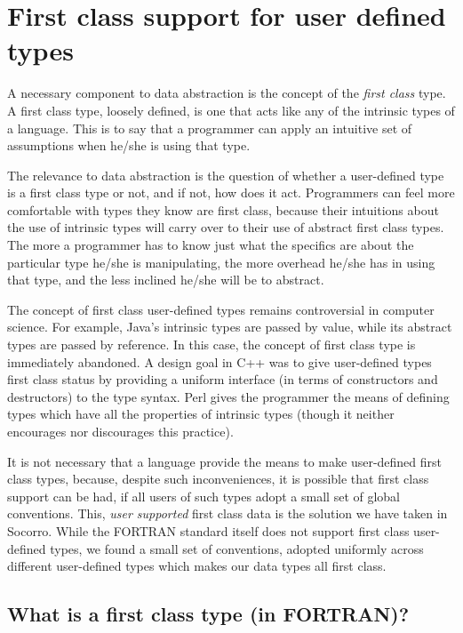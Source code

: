 
\section{First class support for user defined types}

A necessary component to data abstraction is the concept of the {\em
first class} type.  A first class type, loosely defined, is one that
acts like any of the intrinsic types of a language.  This is to say
that a programmer can apply an intuitive set of assumptions when
he/she is using that type.

The relevance to data abstraction is the question of whether a
user-defined type is a first class type or not, and if not, how does
it act.  Programmers can feel more comfortable with types they know
are first class, because their intuitions about the use of intrinsic
types will carry over to their use of abstract first class types.  The
more a programmer has to know just what the specifics are about the
particular type he/she is manipulating, the more overhead he/she has
in using that type, and the less inclined he/she will be to abstract.

The concept of first class user-defined types remains controversial in
computer science.  For example, Java's intrinsic types are passed by
value, while its abstract types are passed by reference.  In this
case, the concept of first class type is immediately abandoned.  A
design goal in C++ was to give user-defined types first class status
by providing a uniform interface (in terms of constructors and
destructors) to the type syntax.  Perl
gives the programmer the means of defining types which have all the
properties of intrinsic types (though it neither encourages nor
discourages this practice).

It is not necessary that a language provide the means to make
user-defined first class types, because, despite such inconveniences,
it is possible that first class support can be had, if all users of
such types adopt a small set of global conventions.  This, {\em user
supported} first class data is the solution we have taken in Socorro.
While the FORTRAN standard itself does not support first class
user-defined types, we found a small set of conventions, adopted
uniformly across different user-defined types which makes our data
types all first class.

\subsection{What is a first class type (in FORTRAN)?}


